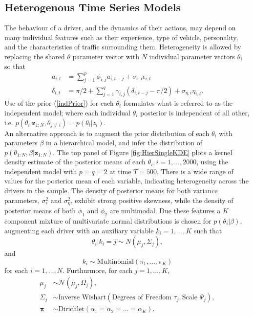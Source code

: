 \documentclass[12pt,a4paper]{article}\usepackage[]{graphicx}\usepackage[]{color}
\begin{document}
\subsection{Heterogenous Time Series Models}
\label{subsec:heterogenous}

The behaviour of a driver, and the dynamics of their actions, may depend on many individual features such as their experience, type of vehicle, personality, and the characteristics of traffic surrounding them. Heterogeneity is allowed by replacing the shared $\theta$ parameter vector with $N$ individual parameter vectors $\theta_i$ so that
\begin{align}
a_{i, t} &= \sum_{j = 1}^p \phi_{i, j} a_{i, t-j} + \sigma_{\epsilon, i} \epsilon_{i, t} \label{aAR2} \\
\delta_{i, t} &= \pi/2 + \sum_{j = 1}^q \gamma_{i, j} (\delta_{i, t-j} - \pi/2) + \sigma_{\eta, i} \eta_{i, t}. \label{dAR2}
\end{align}
Use of the prior (\ref{indPrior}) for each $\theta_i$ formulates what is referred to as the independent model; where each individual $\theta_i$ posterior is independent of all other, i.e. $p(\theta_i | \textbf{z}_{1:N}, \theta_{j \neq i}) = p(\theta_i | z_i)$. 
\\

An alternative approach is to augment the prior distribution of each $\theta_i$ with parameters $\beta$ in a hierarchical model, and infer the distribution of $p(\theta_{1:N}, \beta | \textbf{z}_{1:N})$. The top panel of Figure \ref{fig:HierSingleKDE} plots a kernel density estimate of the posterior means of each $\theta_i, i = 1, \dots, 2000$, using the independent model with $p = q = 2$ at time $T = 500$. There is a wide range of values for the posterior mean of each variable, indicating heterogeneity across the drivers in the sample. The density of posterior means for both variance parameters, $\sigma^2_{\epsilon}$ and $\sigma^2_{\eta}$, exhibit strong positive skewness, while the density of posterior means of both $\phi_1$ and $\phi_2$ are multimodal. Due these features a $K$ component mixture of multivariate normal distributions is chosen for $p(\theta_i | \beta)$, augmenting each driver with an auxiliary variable $k_i = 1, \dots, K$ such that 
\begin{equation}
\label{mixPrior}
\theta_i | k_i = j \sim N(\mu_j, \Sigma_j),
\end{equation}
and
\begin{equation}
k_i \sim \mbox{Multinomial}\left(\pi_1, \dots, \pi_{K}\right)
\end{equation}
for each $i = 1, \dots, N$. Furthurmore, for each $j = 1, \dots, K$,  
\begin{align}
\mu_j &\sim \mathcal{N}\left(\bar{\mu}_j, \Omega_j\right), \\
\Sigma_j &\sim \mbox{Inverse Wishart}\left(\mbox{Degrees of Freedom } \tau_j, \mbox{Scale } \Psi_j\right), \\
\boldsymbol{\pi} &\sim \mbox{Dirichlet}\left(\alpha_1 = \alpha_2 = \dots = \alpha_K\right).
\end{align}
\\
\end{document}
